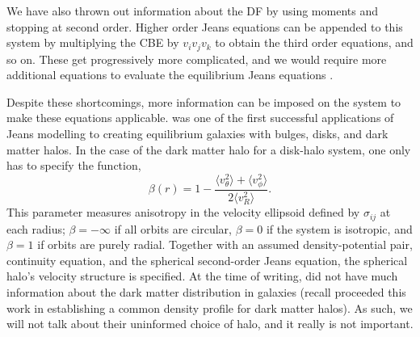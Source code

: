 We have also thrown out information about the DF by using moments and stopping at second order. Higher order Jeans equations can be appended to this system by multiplying the CBE by $v_i v_j v_k$ to obtain the third order equations, and so on. These get progressively more complicated, and we would require more additional equations to evaluate the equilibrium Jeans equations \citep{BT}.

Despite these shortcomings, more information can be imposed on the system to make these equations applicable. \citet{hernquist_1993} was one of the first successful applications of Jeans modelling to creating equilibrium galaxies with bulges, disks, and dark matter halos. In the case of the dark matter halo for a disk-halo system, one only has to specify the function,
\begin{equation}
\beta(r) = 1 - \frac{\langle v_\theta^2\rangle + \langle v_\phi^2 \rangle}{2 \langle v_R^2 \rangle}.
\end{equation}
This parameter measures anisotropy in the velocity ellipsoid defined by $\sigma_{ij}$ at each radius; $\beta = -\infty$ if all orbits are circular, $\beta=0$ if the system is isotropic, and $\beta = 1$ if orbits are purely radial. Together with an assumed density-potential pair, continuity equation, and the spherical second-order Jeans equation, the spherical halo's velocity structure is specified. At the time of writing, \citet{hernquist_1993} did not have much information about the dark matter distribution in galaxies (recall \citep{nfw} proceeded this work in establishing a common density profile for dark matter halos). As such, we will not talk about their uninformed choice of halo, and it really is not important.

